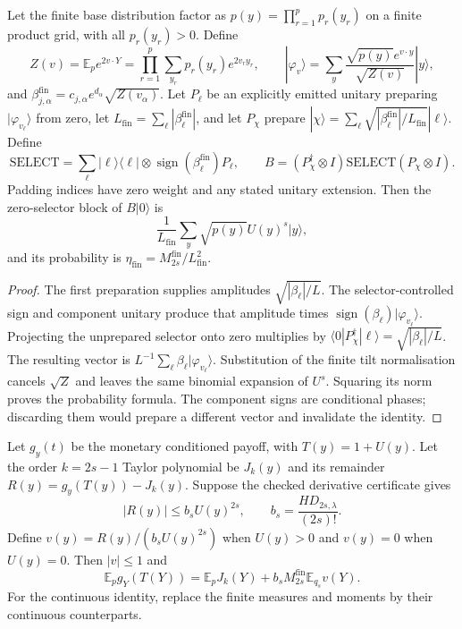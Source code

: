\begin{proposition}
Let the finite base distribution factor as
$p(y)=\prod_{r=1}^p p_r(y_r)$ on a finite product grid, with all
$p_r(y_r)>0$. Define
\[
 Z(v)=\mathbb E_p e^{2v\cdot Y}
      =\prod_{r=1}^p\sum_{y_r}p_r(y_r)e^{2v_r y_r},
 \qquad
 |\varphi_v\rangle=\sum_y
       \frac{\sqrt{p(y)}e^{v\cdot y}}{\sqrt{Z(v)}}|y\rangle,
\]
and $\beta^{\mathrm{fin}}_{j,\alpha}
=c_{j,\alpha}e^{d_\alpha}\sqrt{Z(v_\alpha)}$.
Let $P_\ell$ be an explicitly emitted unitary preparing
$|\varphi_{v_\ell}\rangle$ from zero, let
$L_{\mathrm{fin}}=\sum_\ell|\beta^{\mathrm{fin}}_\ell|$, and let
$P_\chi$ prepare
$|\chi\rangle=\sum_\ell\sqrt{|\beta^{\mathrm{fin}}_\ell|/
L_{\mathrm{fin}}}|\ell\rangle$.
Define
\[
 \mathrm{SELECT}=\sum_\ell |\ell\rangle\langle\ell|
          \otimes\operatorname{sign}(\beta^{\mathrm{fin}}_\ell)P_\ell,
 \qquad
 B=(P_\chi^\dagger\otimes I)\mathrm{SELECT}(P_\chi\otimes I).
\]
Padding indices have zero weight and any stated unitary extension.
Then the zero-selector block of $B|0\rangle$ is
\[
 \frac1{L_{\mathrm{fin}}}\sum_y\sqrt{p(y)}U(y)^s|y\rangle,
\]
and its probability is
$\eta_{\mathrm{fin}}=M_{2s}^{\mathrm{fin}}/L_{\mathrm{fin}}^2$.
\end{proposition}

\begin{proof}
The first preparation supplies amplitudes
$\sqrt{|\beta_\ell|/L}$. The selector-controlled sign and component
unitary produce that amplitude times
$\operatorname{sign}(\beta_\ell)|\varphi_{v_\ell}\rangle$.
Projecting the unprepared selector onto zero multiplies by
$\langle0|P_\chi^\dagger|\ell\rangle
=\sqrt{|\beta_\ell|/L}$. The resulting vector is
$L^{-1}\sum_\ell\beta_\ell|\varphi_{v_\ell}\rangle$.
Substitution of the finite tilt normalisation cancels $\sqrt Z$ and
leaves the same binomial expansion of $U^s$. Squaring its norm proves
the probability formula. The component signs are conditional phases;
discarding them would prepare a different vector and invalidate the
identity.
\end{proof}

\begin{proposition}
Let $g_y(t)$ be the monetary conditioned payoff, with $T(y)=1+U(y)$.
Let the order $k=2s-1$ Taylor polynomial be $J_k(y)$ and its remainder
$R(y)=g_y(T(y))-J_k(y)$. Suppose the checked derivative certificate gives
\[
 |R(y)|\leq b_s U(y)^{2s},\qquad
 b_s=\frac{H D_{2s,\lambda}}{(2s)!}.
\]
Define $v(y)=R(y)/(b_sU(y)^{2s})$ when $U(y)>0$ and $v(y)=0$
when $U(y)=0$. Then $|v|\leq1$ and
\[
 \mathbb E_p g_Y(T(Y))
 =\mathbb E_pJ_k(Y)+b_sM_{2s}^{\mathrm{fin}}\mathbb E_{q_s}v(Y).
\]
For the continuous identity, replace the finite measures and moments
by their continuous counterparts.
\end{proposition}

